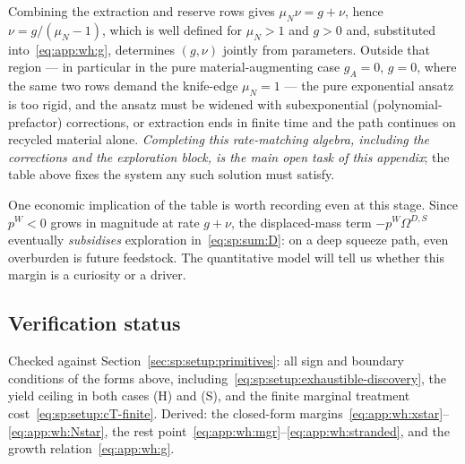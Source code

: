 Combining the extraction and reserve rows gives $\mu_N\nu=g+\nu$, hence $\nu=g/\left(\mu_N-1\right)$, which is well defined for $\mu_N>1$ and $g>0$ and, substituted into~\eqref{eq:app:wh:g}, determines $\left(g,\nu\right)$ jointly from parameters. Outside that region --- in particular in the pure material-augmenting case $g_A=0$, $g=0$, where the same two rows demand the knife-edge $\mu_N=1$ --- the pure exponential ansatz is too rigid, and the ansatz must be widened with subexponential (polynomial-prefactor) corrections, or extraction ends in finite time and the path continues on recycled material alone. \emph{Completing this rate-matching algebra, including the corrections and the exploration block, is the main open task of this appendix}; the table above fixes the system any such solution must satisfy.

One economic implication of the table is worth recording even at this stage. Since $p^W<0$ grows in magnitude at rate $g+\nu$, the displaced-mass term $-p^W\Omega^{D,S}$ eventually \emph{subsidises} exploration in~\eqref{eq:sp:sum:D}: on a deep squeeze path, even overburden is future feedstock. The quantitative model will tell us whether this margin is a curiosity or a driver.

\subsection{Verification status}\label{sec:app:workhorse:status}

Checked against Section~\ref{sec:sp:setup:primitives}: all sign and boundary conditions of the forms above, including~\eqref{eq:sp:setup:exhaustible-discovery}, the yield ceiling in both cases (H) and (S), and the finite marginal treatment cost~\eqref{eq:sp:setup:cT-finite}. Derived: the closed-form margins~\eqref{eq:app:wh:xstar}--\eqref{eq:app:wh:Nstar}, the rest point~\eqref{eq:app:wh:mgr}--\eqref{eq:app:wh:stranded}, and the growth relation~\eqref{eq:app:wh:g}.

